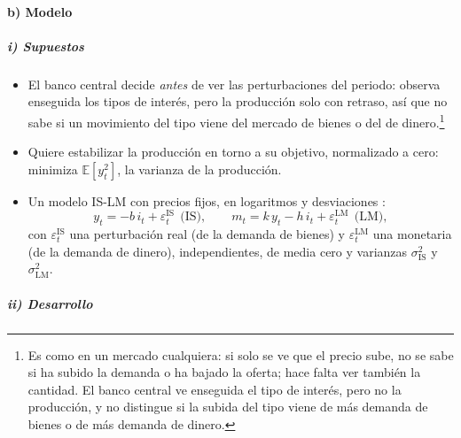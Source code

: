 \documentclass[11pt]{article}
\begin{document}
\paragraph{b) Modelo}

\subparagraph{i) Supuestos}

\begin{itemize}
\item El banco central decide \emph{antes} de ver las perturbaciones del periodo: observa enseguida los tipos de interés, pero la producción solo con retraso, así que no sabe si un movimiento del tipo viene del mercado de bienes o del de dinero.\footnote{Es como en un mercado cualquiera: si solo se ve que el precio sube, no se sabe si ha subido la demanda o ha bajado la oferta; hace falta ver también la cantidad. El banco central ve enseguida el tipo de interés, pero no la producción, y no distingue si la subida del tipo viene de más demanda de bienes o de más demanda de dinero.}
\item Quiere estabilizar la producción en torno a su objetivo, normalizado a cero: minimiza $\mathbb{E}[y_t^2]$, la varianza de la producción.
\item Un modelo IS-LM con precios fijos, en logaritmos y desviaciones :
  $$y_t=-b\,i_t+\varepsilon^{\mathrm{IS}}_t\ \ \text{(IS)},\qquad m_t=k\,y_t-h\,i_t+\varepsilon^{\mathrm{LM}}_t\ \ \text{(LM)},$$
  con $\varepsilon^{\mathrm{IS}}_t$ una perturbación real (de la demanda de bienes) y $\varepsilon^{\mathrm{LM}}_t$ una monetaria (de la demanda de dinero), independientes, de media cero y varianzas $\sigma^2_{\mathrm{IS}}$ y $\sigma^2_{\mathrm{LM}}$.
\end{itemize}

\subparagraph{ii) Desarrollo}
\end{document}
